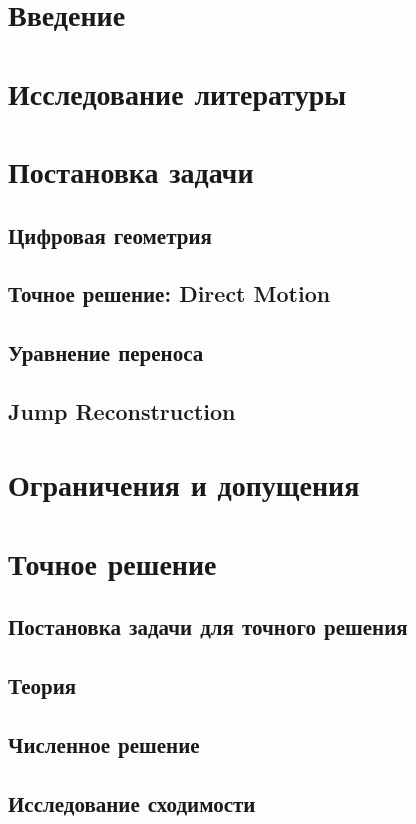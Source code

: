 \documentclass[10pt,a4paper]{article}
\begin{document}
\section{Введение}

\section{Исследование литературы}

\section{Постановка задачи}

\subsection{Цифровая геометрия}
\subsection{Точное решение: Direct Motion}
\subsection{Уравнение переноса}
\subsection{Jump Reconstruction}

\section{Ограничения и допущения}

\section{Точное решение}
\subsection{Постановка задачи для точного решения}
\subsection{Теория}
\subsection{Численное решение}
\subsection{Исследование сходимости}
\end{document}
